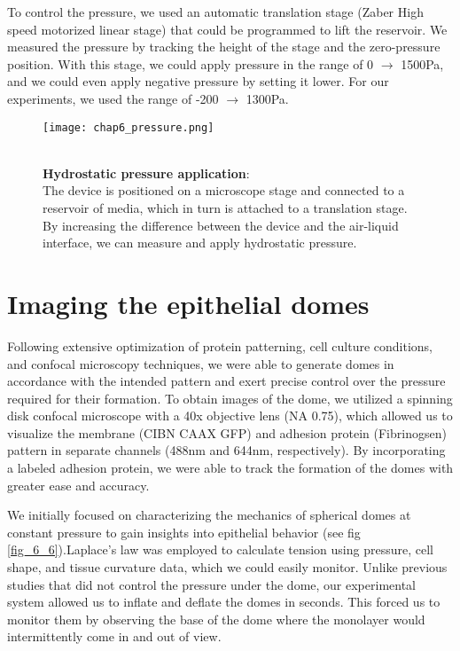 To control the pressure, we used an automatic translation stage (Zaber High speed motorized linear stage) that could be programmed to lift the reservoir. We measured the pressure by tracking the height of the stage and the zero-pressure position. With this stage, we could apply pressure in the range of 0 $\rightarrow$ 1500\unit{\pascal}, and we could even apply negative pressure by setting it lower. For our experiments, we used the range of -200 $\rightarrow$ 1300\unit{\pascal}.

\begin{figure}
	\begin{minipage}[c]{0.6\textwidth}
		\texttt{[image: chap6\_pressure.png]}
	\end{minipage}\hfill
	\begin{minipage}[c]{0.35\textwidth}
		\caption{\\ \textbf{Hydrostatic pressure application}:\\ The device is positioned on a microscope stage and connected to a reservoir of media, which in turn is attached to a translation stage. By increasing the difference between the device and the air-liquid interface, we can measure and apply hydrostatic pressure.
		} \label{fig_6_3}
	\end{minipage}
\end{figure}


\hypertarget{imaging-the-epithelial-domes}{%
\section{Imaging the epithelial
domes}\label{imaging-the-epithelial-domes}}

Following extensive optimization of protein patterning, cell culture conditions, and confocal microscopy techniques, we were able to generate domes in accordance with the intended pattern and exert precise control over the pressure required for their formation. To obtain images of the dome, we utilized a spinning disk confocal microscope with a 40x objective lens (NA 0.75), which allowed us to visualize the membrane (CIBN CAAX GFP) and adhesion protein (Fibrinogsen) pattern in separate channels (488\unit{\nm} and 644\unit{\nm}, respectively). By incorporating a labeled adhesion protein, we were able to track the formation of the domes with greater ease and accuracy.

We initially focused on characterizing the mechanics of spherical domes at constant pressure to gain insights into epithelial behavior (see fig \ref{fig_6_6}).Laplace's law was employed to calculate tension using pressure, cell shape, and tissue curvature data, which we could easily monitor. Unlike previous studies that did not control the pressure under the dome, our experimental system allowed us to inflate and deflate the domes in seconds. This forced us to monitor them by observing the base of the dome where the monolayer would intermittently come in and out of view.

